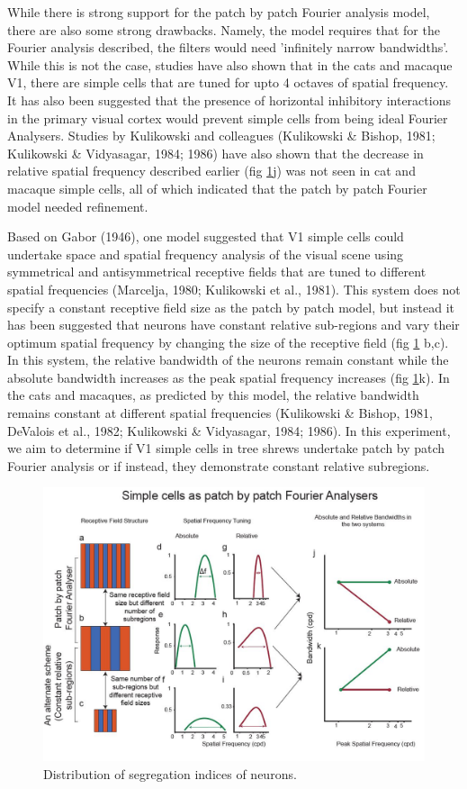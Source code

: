 	While there is strong support for the patch by patch Fourier analysis model, there are also some strong drawbacks. Namely, the model requires that for the Fourier analysis described, the filters would need 'infinitely narrow bandwidths'. While this is not the case, studies have also shown that in the cats and macaque V1, there are simple cells that are tuned for upto 4 octaves of spatial frequency. It has also been suggested that the presence of horizontal inhibitory interactions in the primary visual cortex would prevent simple cells from being ideal Fourier Analysers. Studies by Kulikowski and colleagues (Kulikowski \& Bishop, 1981; Kulikowski \& Vidyasagar, 1984; 1986) have also shown that the decrease in relative spatial frequency described earlier (fig \ref{fig:summary}j) was not seen in cat and macaque simple cells, all of which indicated that the patch by patch Fourier model needed refinement.
	
	Based on Gabor (1946), one model suggested that V1 simple cells could undertake space and spatial frequency analysis of the visual scene using symmetrical and antisymmetrical receptive fields that are tuned to different spatial frequencies (Marcelja, 1980; Kulikowski et al., 1981). This system does not specify a constant receptive field size as the patch by patch model, but instead it has been suggested that neurons have constant relative sub-regions and vary their optimum spatial frequency by changing the size of the receptive field (fig \ref{fig:summary} b,c). In this system, the relative bandwidth of the neurons remain constant while the absolute bandwidth increases as the peak spatial frequency increases (fig \ref{fig:summary}k). In the cats and macaques, as predicted by this model, the relative bandwidth remains constant at different spatial frequencies (Kulikowski \& Bishop, 1981, DeValois et al., 1982; Kulikowski \& Vidyasagar, 1984; 1986). In this experiment, we aim to determine if V1 simple cells in tree shrews undertake patch by patch Fourier analysis or if instead, they demonstrate constant relative subregions.
	
	\begin{figure}[]
		
		\includegraphics[width=\linewidth]{LinearV1/scheme.jpg}
		\caption{Distribution of segregation indices of neurons.}
		\label{fig:summary}
	\end{figure}

